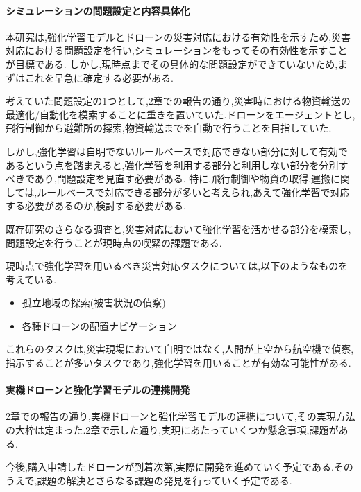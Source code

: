 \documentclass{article}[jsarticle]
\begin{document}
\paragraph{シミュレーションの問題設定と内容具体化}
本研究は,強化学習モデルとドローンの災害対応における有効性を示すため,災害対応における問題設定を行い,シミュレーションをもってその有効性を示すことが目標である.
しかし,現時点までその具体的な問題設定ができていないため,まずはこれを早急に確定する必要がある.\par 
考えていた問題設定の1つとして,2章での報告の通り,災害時における物資輸送の最適化/自動化を模索することに重きを置いていた.ドローンをエージェントとし,飛行制御から避難所の探索,物資輸送までを自動で行うことを目指していた.\par
しかし,強化学習は自明でないルールベースで対応できない部分に対して有効であるという点を踏まえると,強化学習を利用する部分と利用しない部分を分別すべきであり,問題設定を見直す必要がある.
特に,飛行制御や物資の取得,運搬に関しては,ルールベースで対応できる部分が多いと考えられ,あえて強化学習で対応する必要があるのか,検討する必要がある.\par
既存研究のさらなる調査と,災害対応において強化学習を活かせる部分を模索し,問題設定を行うことが現時点の喫緊の課題である.\par
現時点で強化学習を用いるべき災害対応タスクについては,以下のようなものを考えている.
\begin{itemize}
    \item 孤立地域の探索(被害状況の偵察)
    \item 各種ドローンの配置ナビゲーション
\end{itemize}
これらのタスクは,災害現場において自明ではなく,人間が上空から航空機で偵察,指示することが多いタスクであり,強化学習を用いることが有効な可能性がある.\par
\paragraph{実機ドローンと強化学習モデルの連携開発}
2章での報告の通り,実機ドローンと強化学習モデルの連携について,その実現方法の大枠は定まった.2章で示した通り,実現にあたっていくつか懸念事項,課題がある.\par
今後,購入申請したドローンが到着次第,実際に開発を進めていく予定である.そのうえで,課題の解決とさらなる課題の発見を行っていく予定である.\par 
\end{document}

